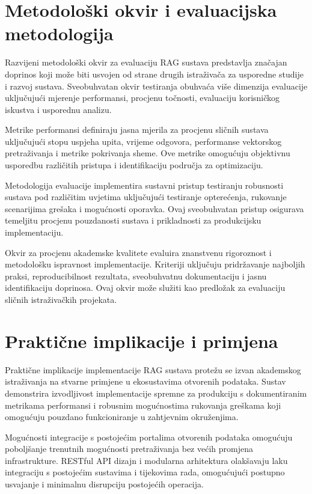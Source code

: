 \section{Metodološki okvir i evaluacijska metodologija}
\label{sec:methodological_framework}

Razvijeni metodološki okvir za evaluaciju RAG sustava predstavlja značajan doprinos koji može biti usvojen od strane drugih istraživača za usporedne studije i razvoj sustava. Sveobuhvatan okvir testiranja obuhvaća više dimenzija evaluacije uključujući mjerenje performansi, procjenu točnosti, evaluaciju korisničkog iskustva i usporednu analizu.

Metrike performansi definiraju jasna mjerila za procjenu sličnih sustava uključujući stopu uspjeha upita, vrijeme odgovora, performanse vektorskog pretraživanja i metrike pokrivanja sheme. Ove metrike omogućuju objektivnu usporedbu različitih pristupa i identifikaciju područja za optimizaciju.

Metodologija evaluacije implementira sustavni pristup testiranju robusnosti sustava pod različitim uvjetima uključujući testiranje opterećenja, rukovanje scenarijima grešaka i mogućnosti oporavka. Ovaj sveobuhvatan pristup osigurava temeljitu procjenu pouzdanosti sustava i prikladnosti za produkcijsku implementaciju.

Okvir za procjenu akademske kvalitete evaluira znanstvenu rigoroznost i metodološku ispravnost implementacije. Kriteriji uključuju pridržavanje najboljih praksi, reproducibilnost rezultata, sveobuhvatnu dokumentaciju i jasnu identifikaciju doprinosa. Ovaj okvir može služiti kao predložak za evaluaciju sličnih istraživačkih projekata.

\section{Praktične implikacije i primjena}
\label{sec:practical_implications}

Praktične implikacije implementacije RAG sustava protežu se izvan akademskog istraživanja na stvarne primjene u ekosustavima otvorenih podataka. Sustav demonstrira izvodljivost implementacije spremne za produkciju s dokumentiranim metrikama performansi i robusnim mogućnostima rukovanja greškama koji omogućuju pouzdano funkcioniranje u zahtjevnim okruženjima.

Mogućnosti integracije s postojećim portalima otvorenih podataka omogućuju poboljšanje trenutnih mogućnosti pretraživanja bez većih promjena infrastrukture. RESTful API dizajn i modularna arhitektura olakšavaju laku integraciju s postojećim sustavima i tijekovima rada, omogućujući postupno usvajanje i minimalnu disrupciju postojećih operacija.

